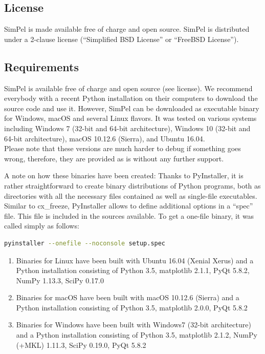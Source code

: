 \documentclass[pdftex,bezier,german,a4,twoside, headexclude,12pt,nochapterprefix, titlepage]{extarticle}
\newcommand{\simpel}{\textsf{SimPel}}
\begin{document}
\subsection{License}
\simpel{} is made available free of charge and open source. 
\simpel{} is distributed under a 2-clause license (“Simplified BSD License” or “FreeBSD License”).

\subsection{Requirements}
\simpel{} is available free of charge and open source (see license). We recommend everybody with a recent Python installation on their computers to download the source code and use it. 
However, 
\simpel{} can be downloaded as executable binary for Windows, macOS and several Linux flavors.
It was tested on various systems including Windows 7 (32-bit and 64-bit architecture), Windows 10 (32-bit and 64-bit architecture), macOS 10.12.6 (Sierra),
and Ubuntu 16.04.\\

Please note that these versions are much harder to debug if something goes wrong, therefore, they are provided as is without any further support. 



A note on how these binaries have been created: Thanks to PyInstaller, it is rather straightforward to create binary distributions
of Python programs, both as directories with all the necessary files contained as well as single-file executables. 
Similar to cx\_freeze, PyInstaller allows to define additional options in a “spec” file. 
This file is included in the sources available. To get a one-file binary, it was called simply as follows:\\
\begin{lstlisting}[language=bash]
  pyinstaller --onefile --noconsole setup.spec
\end{lstlisting}
\begin{enumerate}
\item Binaries for Linux have been built with Ubuntu 16.04 (Xenial Xerus) and a Python installation consisting of Python 3.5, matplotlib 2.1.1, PyQt 5.8.2,  NumPy 1.13.3, SciPy 0.17.0
\item  Binaries for macOS have been built with macOS 10.12.6 (Sierra) and a Python installation consisting of Python 3.5, matplotlib 2.0.0, PyQt 5.8.2
 \item  Binaries for Windows have been built with Windows7 (32-bit architecture) and a Python installation consisting of Python 3.5, matplotlib 2.1.2, NumPy (+MKL) 1.11.3, SciPy 0.19.0, PyQt 5.8.2
\end{enumerate}
\end{document}
